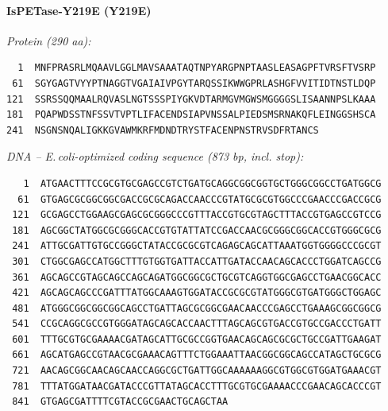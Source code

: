 \documentclass[11pt]{article}
\begin{document}
\paragraph{IsPETase-Y219E  (Y219E)}
\noindent\textit{Protein (290 aa):}
\begin{verbatim}
  1  MNFPRASRLMQAAVLGGLMAVSAAATAQTNPYARGPNPTAASLEASAGPFTVRSFTVSRP
 61  SGYGAGTVYYPTNAGGTVGAIAIVPGYTARQSSIKWWGPRLASHGFVVITIDTNSTLDQP
121  SSRSSQQMAALRQVASLNGTSSSPIYGKVDTARMGVMGWSMGGGGSLISAANNPSLKAAA
181  PQAPWDSSTNFSSVTVPTLIFACENDSIAPVNSSALPIEDSMSRNAKQFLEINGGSHSCA
241  NSGNSNQALIGKKGVAWMKRFMDNDTRYSTFACENPNSTRVSDFRTANCS
\end{verbatim}
\medskip
\noindent\textit{DNA -- E.\,coli-optimized coding sequence (873 bp, incl. stop):}
\begin{verbatim}
   1  ATGAACTTTCCGCGTGCGAGCCGTCTGATGCAGGCGGCGGTGCTGGGCGGCCTGATGGCG
  61  GTGAGCGCGGCGGCGACCGCGCAGACCAACCCGTATGCGCGTGGCCCGAACCCGACCGCG
 121  GCGAGCCTGGAAGCGAGCGCGGGCCCGTTTACCGTGCGTAGCTTTACCGTGAGCCGTCCG
 181  AGCGGCTATGGCGCGGGCACCGTGTATTATCCGACCAACGCGGGCGGCACCGTGGGCGCG
 241  ATTGCGATTGTGCCGGGCTATACCGCGCGTCAGAGCAGCATTAAATGGTGGGGCCCGCGT
 301  CTGGCGAGCCATGGCTTTGTGGTGATTACCATTGATACCAACAGCACCCTGGATCAGCCG
 361  AGCAGCCGTAGCAGCCAGCAGATGGCGGCGCTGCGTCAGGTGGCGAGCCTGAACGGCACC
 421  AGCAGCAGCCCGATTTATGGCAAAGTGGATACCGCGCGTATGGGCGTGATGGGCTGGAGC
 481  ATGGGCGGCGGCGGCAGCCTGATTAGCGCGGCGAACAACCCGAGCCTGAAAGCGGCGGCG
 541  CCGCAGGCGCCGTGGGATAGCAGCACCAACTTTAGCAGCGTGACCGTGCCGACCCTGATT
 601  TTTGCGTGCGAAAACGATAGCATTGCGCCGGTGAACAGCAGCGCGCTGCCGATTGAAGAT
 661  AGCATGAGCCGTAACGCGAAACAGTTTCTGGAAATTAACGGCGGCAGCCATAGCTGCGCG
 721  AACAGCGGCAACAGCAACCAGGCGCTGATTGGCAAAAAAGGCGTGGCGTGGATGAAACGT
 781  TTTATGGATAACGATACCCGTTATAGCACCTTTGCGTGCGAAAACCCGAACAGCACCCGT
 841  GTGAGCGATTTTCGTACCGCGAACTGCAGCTAA
\end{verbatim}
\bigskip
\end{document}

